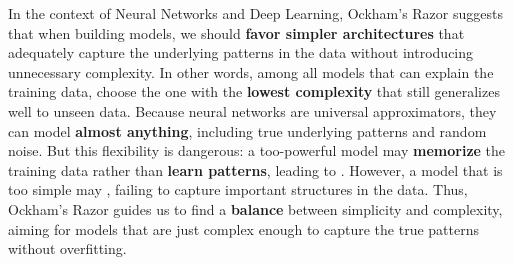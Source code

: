 \highspace
In the context of Neural Networks and Deep Learning, Ockham's Razor suggests that when building models, we should \textbf{favor simpler architectures} that adequately capture the underlying patterns in the data without introducing unnecessary complexity. In other words, among all models that can explain the training data, choose the one with the \textbf{lowest complexity} that still generalizes well to unseen data. Because neural networks are universal approximators, they can model \textbf{almost anything}, including true underlying patterns and random noise. But this flexibility is dangerous: a too-powerful model may \textbf{memorize} the training data rather than \textbf{learn patterns}, leading to . However, a model that is too simple may , failing to capture important structures in the data. Thus, Ockham's Razor guides us to find a \textbf{balance} between simplicity and complexity, aiming for models that are just complex enough to capture the true patterns without overfitting.

